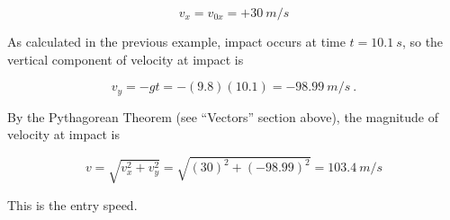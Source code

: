 \documentclass[main.tex]{subfiles}
\begin{document}
\begin{equation*}
    v_x = v_{0x} = +\SI{30}{m/s}
\end{equation*}

As calculated in the previous example, impact occurs at time $t=\SI{10.1}{s}$, so the vertical component of velocity at impact is

\begin{equation*}
    v_y = - g t =  - (9.8)(10.1) = \SI{-98.99}{m/s}\ .
\end{equation*}

By the Pythagorean Theorem (see ``Vectors'' section above), the magnitude of velocity at impact is

\begin{equation*}
    v = \sqrt{v_x^2 + v_y^2}
    = \sqrt{\left(30\right)^2 + \left(-98.99\right)^2}
    = \SI{103.4}{m/s}
\end{equation*}

This is the entry speed.
\end{document}
